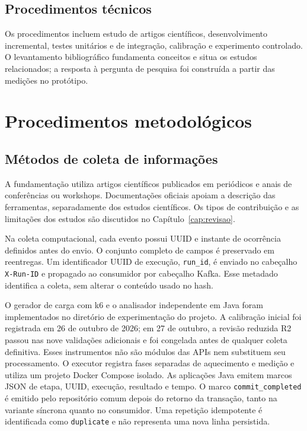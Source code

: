 \subsection{Procedimentos técnicos}
Os procedimentos incluem estudo de artigos científicos, desenvolvimento incremental, testes unitários e de integração, calibração e experimento controlado. O levantamento bibliográfico fundamenta conceitos e situa os estudos relacionados; a resposta à pergunta de pesquisa foi construída a partir das medições no protótipo.

\section{Procedimentos metodológicos}

\subsection{Métodos de coleta de informações}
A fundamentação utiliza artigos científicos publicados em periódicos e anais de conferências ou workshops. Documentações oficiais apoiam a descrição das ferramentas, separadamente dos estudos científicos. Os tipos de contribuição e as limitações dos estudos são discutidos no Capítulo~\ref{cap:revisao}.

Na coleta computacional, cada evento possui UUID e instante de ocorrência definidos antes do envio. O conjunto completo de campos é preservado em reentregas. Um identificador UUID de execução, \texttt{run\_id}, é enviado no cabeçalho \texttt{X-Run-ID} e propagado ao consumidor por cabeçalho Kafka. Esse metadado identifica a coleta, sem alterar o conteúdo usado no hash.

O gerador de carga com k6 e o analisador independente em Java foram implementados no diretório de experimentação do projeto. A calibração inicial foi registrada em 26 de outubro de 2026; em 27 de outubro, a revisão reduzida R2 passou nas nove validações adicionais e foi congelada antes de qualquer coleta definitiva. Esses instrumentos não são módulos das APIs nem substituem seu processamento. O executor registra fases separadas de aquecimento e medição e utiliza um projeto Docker Compose isolado. As aplicações Java emitem marcos JSON de etapa, UUID, execução, resultado e tempo. O marco \texttt{commit\_completed} é emitido pelo repositório comum depois do retorno da transação, tanto na variante síncrona quanto no consumidor. Uma repetição idempotente é identificada como \texttt{duplicate} e não representa uma nova linha persistida.

